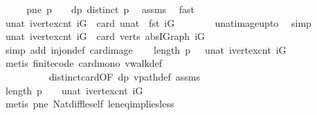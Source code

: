 \begin{isabellebody}
%
\isadelimproof
%
\endisadelimproof
%
\isatagproof
{}\isamarkupfalse%
\ {\isacharminus}\isanewline
\ \ \isamarkupfalse%
\ pne{\isacharcolon}\ {\isachardoublequoteopen}p\ {\isasymnoteq}\ {\isacharbrackleft}{\isacharbrackright}{\isachardoublequoteclose}\ \ dp{\isacharcolon}\ {\isachardoublequoteopen}distinct\ p{\isachardoublequoteclose}\ \isamarkupfalse%
\ assms\ \isamarkupfalse%
\ fast{\isacharplus}\isanewline
\ \ \isamarkupfalse%
\ {\isachardoublequoteopen}unat\ {\isacharparenleft}ivertex{\isacharunderscore}cnt\ iG{\isacharparenright}\ {\isacharequal}\ card\ {\isacharparenleft}unat\ {\isacharbackquote}\ {\isacharbraceleft}{}{\isachardot}{\isachardot}{\isacharless}{\isacharparenleft}fst\ iG{\isacharparenright}{\isacharbraceright}{\isacharparenright}{\isachardoublequoteclose}\ \ \isanewline
\ \ \ \ \isamarkupfalse%
\ unat{\isacharunderscore}image{\isacharunderscore}upto\ \isamarkupfalse%
\ simp\isanewline
\ \ \isamarkupfalse%
\ \isamarkupfalse%
\ {\isachardoublequoteopen}unat\ {\isacharparenleft}ivertex{\isacharunderscore}cnt\ iG{\isacharparenright}\ {\isacharequal}\ card\ {\isacharparenleft}{\isacharparenleft}verts\ {\isacharparenleft}abs{\isacharunderscore}IGraph\ iG{\isacharparenright}{\isacharparenright}{\isacharparenright}{\isachardoublequoteclose}\ \ \isanewline
\ \ \ \ \ \isamarkupfalse%
\ {\isacharparenleft}simp\ add{\isacharcolon}\ inj{\isacharunderscore}on{\isacharunderscore}def\ card{\isacharunderscore}image{\isacharparenright}\isanewline
\ \ \isamarkupfalse%
\ {\isachardoublequoteopen}length\ p\ \ {\isasymle}\ unat\ {\isacharparenleft}ivertex{\isacharunderscore}cnt\ iG{\isacharparenright}{\isachardoublequoteclose}\ \isanewline
\ \ \ \ \ \ \isamarkupfalse%
\ {\isacharparenleft}metis\ finite{\isacharunderscore}code\ card{\isacharunderscore}mono\ vwalk{\isacharunderscore}def\isanewline
\ \ \ \ \ \ \ \ \ \ distinct{\isacharunderscore}card{\isacharbrackleft}OF\ dp{\isacharbrackright}\ vpath{\isacharunderscore}def\ assms{\isacharparenright}\isanewline
\ \ \isamarkupfalse%
\ {\isachardoublequoteopen}length\ p\ {\isacharminus}\ {}\ {\isacharless}\ unat\ {\isacharparenleft}ivertex{\isacharunderscore}cnt\ iG{\isacharparenright}{\isachardoublequoteclose}\ \isanewline
\ \ \ \ \isamarkupfalse%
\ {\isacharparenleft}metis\ pne\ Nat{\isachardot}diff{\isacharunderscore}le{\isacharunderscore}self\ le{\isacharunderscore}neq{\isacharunderscore}implies{\isacharunderscore}less\ \isanewline

\end{isabellebody}
